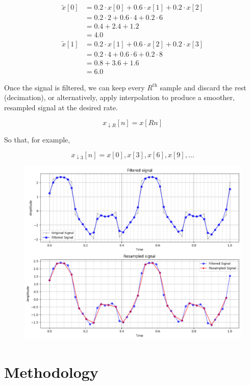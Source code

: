 \documentclass[conference]{IEEEtran}
\begin{document}
\begin{align*}
	\tilde{x}[0]	&= 0.2 \cdot x[0] + 0.6 \cdot x[1] + 0.2 \cdot x[2] \\
					&= 0.2\cdot2 + 0.6\cdot4 + 0.2\cdot6 \\
					&= 0.4 + 2.4 + 1.2 \\
					&= 4.0\\
	\tilde{x}[1] 	&= 0.2 \cdot x[1] + 0.6 \cdot x[2] + 0.2 \cdot x[3] \\
					&= 0.2\cdot4 + 0.6\cdot6 + 0.2\cdot8 \\
					&= 0.8 + 3.6 + 1.6 \\
					&= 6.0
\end{align*}

Once the signal is filtered, we can keep every $R^\text{th}$ sample and discard the rest (decimation), or alternatively, apply interpolation to produce a smoother, resampled signal at the desired rate.

$$x_{\downarrow R}[n] = x[Rn]$$

So that, for example,

$$x_{\downarrow 3}[n] = x[0], x[3], x[6], x[9], \dots$$


\begin{figure}[H]
	\centering
	\includegraphics[width=0.9\linewidth]{img/img-resampling}
	\caption{}
	\label{fig:img-resampling}
\end{figure}




\section{Methodology}
\end{document}
